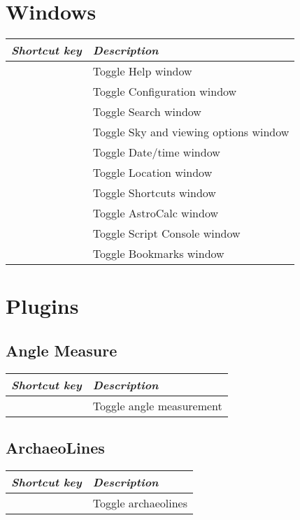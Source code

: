 \section{Windows}
\label{ch:Hotkeys:Windows}
\begin{longtabu}to \textwidth {cl} 
\toprule
\emph{Shortcut key}	& \emph{Description}\\\midrule
{}			& Toggle Help window \\
			& Toggle Configuration window \\
			& Toggle Search window \\
			& Toggle Sky and viewing options window \\
			& Toggle Date/time window \\
			& Toggle Location window \\
			& Toggle Shortcuts window \\
			& Toggle AstroCalc window\\
			& Toggle Script Console window \\
			& Toggle Bookmarks window \\
\bottomrule
\end{longtabu}

\section{Plugins}
\label{ch:Hotkeys:Plugins}

\subsection{Angle Measure}
\label{ch:Hotkeys:Plugins:AngleMeasure}
\begin{longtabu}to \textwidth {cl} 
\toprule
\emph{Shortcut key}	& \emph{Description}\\\midrule
{}		& Toggle angle measurement \\
\bottomrule
\end{longtabu}

\subsection{ArchaeoLines}
\label{ch:Hotkeys:Plugins:ArchaeoLines}
\begin{longtabu}to \textwidth {cl} 
\toprule
\emph{Shortcut key}	& \emph{Description}\\\midrule
{}		& Toggle archaeolines \\
\bottomrule
\end{longtabu}

